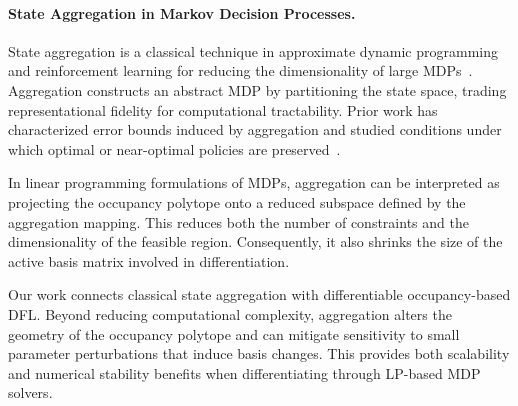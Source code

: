 \paragraph{State Aggregation in Markov Decision Processes.}

State aggregation is a classical technique in approximate dynamic programming and reinforcement learning for reducing the dimensionality of large MDPs~\cite{bertsekas1996neuro, li2006towards}. Aggregation constructs an abstract MDP by partitioning the state space, trading representational fidelity for computational tractability. Prior work has characterized error bounds induced by aggregation and studied conditions under which optimal or near-optimal policies are preserved~\cite{singh1995reinforcement, li2006towards}.

In linear programming formulations of MDPs, aggregation can be interpreted as projecting the occupancy polytope onto a reduced subspace defined by the aggregation mapping. This reduces both the number of constraints and the dimensionality of the feasible region. Consequently, it also shrinks the size of the active basis matrix involved in differentiation.

Our work connects classical state aggregation with differentiable occupancy-based DFL. Beyond reducing computational complexity, aggregation alters the geometry of the occupancy polytope and can mitigate sensitivity to small parameter perturbations that induce basis changes. This provides both scalability and numerical stability benefits when differentiating through LP-based MDP solvers.